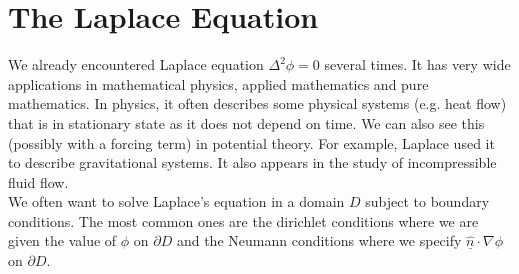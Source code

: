 \section{The Laplace Equation}
We already encountered Laplace equation $\Delta^2\phi=0$ several times.
It has very wide applications in mathematical physics, applied mathematics and pure mathematics.
In physics, it often describes some physical systems (e.g. heat flow) that is in stationary state as it does not depend on time.
We can also see this (possibly with a forcing term) in potential theory.
For example, Laplace used it to describe gravitational systems.
It also appears in the study of incompressible fluid flow.\\
We often want to solve Laplace's equation in a domain $D$ subject to boundary conditions.
The most common ones are the dirichlet conditions where we are given the value of $\phi$ on $\partial D$ and the Neumann conditions where we specify $\underline{\hat{n}}\cdot\nabla\phi$ on $\partial D$.

